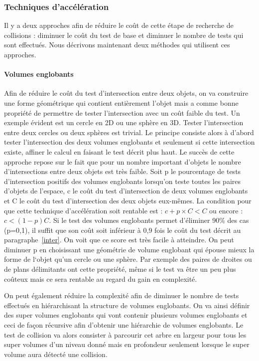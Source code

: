 \documentclass{article}
\begin{document}
\subsubsection{Techniques d'accélération}
Il y a deux approches afin de réduire le coût de cette étape de recherche de collisions : diminuer le coût du test de base et diminuer le nombre de tests qui sont effectués. Nous décrivons maintenant deux méthodes qui utilisent ces approches.

\paragraph{Volumes englobants}
Afin de réduire le coût du test d’intersection entre deux objets, on va construire une forme géométrique qui contient entièrement l’objet mais a comme bonne propriété de permettre de tester l’intersection avec un coût faible du test. Un exemple évident est un cercle en 2D ou une sphère en 3D. Tester l’intersection entre deux cercles ou deux sphères est trivial. Le principe consiste alors à d’abord tester l’intersection des deux volumes englobants et seulement si cette intersection existe, affiner le calcul en faisant le test décrit plus haut. Le succès de cette approche repose sur le fait que pour un nombre important d’objets le nombre d’intersections entre deux objets est très faible. Soit p le pourcentage de tests d’intersection positifs des volumes englobants lorsqu’on teste toutes les paires d’objets de l’espace, c le coût du test d’intersection de deux volumes englobants et C le coût du test d’intersection des deux objets eux-mêmes. La condition pour que cette technique d’accélération soit rentable est : $c + p \times C < C$ ou encore : $c < (1-p)C$. Si le test des volumes englobants permet d’éliminer 90\% des cas (p=0,1), il suffit que son coût soit inférieur à 0,9 fois le coût du test décrit au paragraphe~\ref{inter}. On voit que ce score est très facile à atteindre. On peut diminuer p en choisissant une géométrie de volume englobant qui épouse mieux la forme de l‘objet qu’un cercle ou une sphère. Par exemple des paires de droites ou de plans délimitants ont cette propriété, même si le test va être un peu plus coûteux mais ce sera rentable au regard du gain en complexité.

On peut également réduire la complexité afin de diminuer le nombre de tests effectués en hiérarchisant la structure de volumes englobants. On va ainsi définir des super volumes englobants qui vont contenir plusieurs volumes englobants et ceci de façon récursive afin d’obtenir une hiérarchie de volumes englobants. Le test de collision va alors consister à parcourir cet arbre en largeur pour tous les super volumes d’un niveau donné mais en profondeur seulement lorsque le super volume aura détecté une collision.
\end{document}
